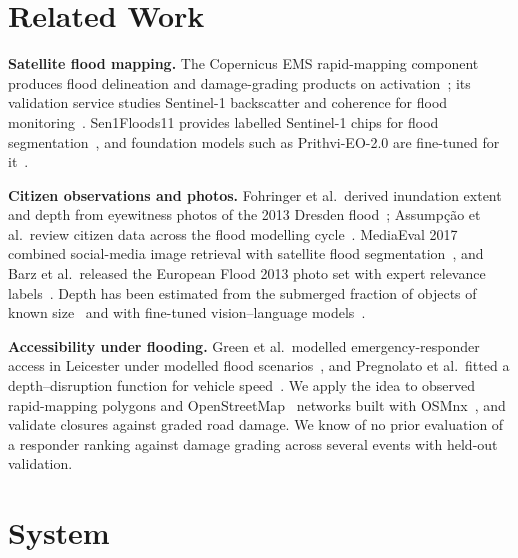 \documentclass[conference]{IEEEtran}
\begin{document}
\section{Related Work}

\textbf{Satellite flood mapping.} The Copernicus EMS rapid-mapping component produces flood delineation and damage-grading products on activation~\cite{cems_rapid}; its validation service studies Sentinel-1 backscatter and coherence for flood monitoring~\cite{donezar2020validation}. Sen1Floods11 provides labelled Sentinel-1 chips for flood segmentation~\cite{bonafilia2020sen1floods11}, and foundation models such as Prithvi-EO-2.0 are fine-tuned for it~\cite{szwarcman2024prithvi}.

\textbf{Citizen observations and photos.} Fohringer et al.\ derived inundation extent and depth from eyewitness photos of the 2013 Dresden flood~\cite{fohringer2015social}; Assump\c{c}\~ao et al.\ review citizen data across the flood modelling cycle~\cite{assumpcao2018citizen}. MediaEval 2017 combined social-media image retrieval with satellite flood segmentation~\cite{bischke2017mediaeval}, and Barz et al.\ released the European Flood 2013 photo set with expert relevance labels~\cite{barz2018flood}. Depth has been estimated from the submerged fraction of objects of known size~\cite{chaudhary2019water} and with fine-tuned vision--language models~\cite{fuad2026floodllama}.

\textbf{Accessibility under flooding.} Green et al.\ modelled emergency-responder access in Leicester under modelled flood scenarios~\cite{green2017accessibility}, and Pregnolato et al.\ fitted a depth--disruption function for vehicle speed~\cite{pregnolato2017depth}. We apply the idea to observed rapid-mapping polygons and OpenStreetMap~\cite{haklay2008osm} networks built with OSMnx~\cite{boeing2017osmnx}, and validate closures against graded road damage. We know of no prior evaluation of a responder ranking against damage grading across several events with held-out validation.

\section{System}\label{sec:method}
\end{document}
